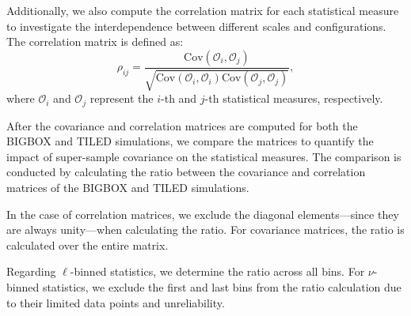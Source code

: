 Additionally, we also compute the correlation matrix for each statistical measure to investigate the interdependence between different scales and configurations. The correlation matrix is defined as:
\begin{equation}
    \rho_{ij} = \frac{\text{Cov}(\mathcal{O}_i, \mathcal{O}_j)}{\sqrt{\text{Cov}(\mathcal{O}_i, \mathcal{O}_i)\text{Cov}(\mathcal{O}_j, \mathcal{O}_j)}},
\end{equation}
where $\mathcal{O}_i$ and $\mathcal{O}_j$ represent the $i$-th and $j$-th statistical measures, respectively.

After the covariance and correlation matrices are computed for both the BIGBOX and TILED simulations, we compare the matrices to quantify the impact of super-sample covariance on the statistical measures. The comparison is conducted by calculating the ratio between the covariance and correlation matrices of the BIGBOX and TILED simulations. 

In the case of correlation matrices, we exclude the diagonal elements---since they are always unity---when calculating the ratio. For covariance matrices, the ratio is calculated over the entire matrix. 

Regarding $\ell$-binned statistics, we determine the ratio across all bins. For $\nu$-binned statistics, we exclude the first and last bins from the ratio calculation due to their limited data points and unreliability.